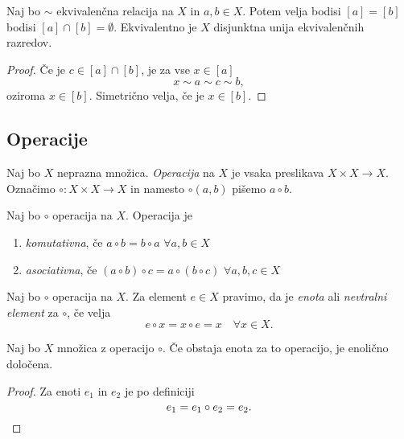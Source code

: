 \documentclass[12pt, a4paper]{article}
\begin{document}
\begin{trditev}
Naj bo $\sim$ ekvivalenčna relacija na $X$ in $a,b\in X$. Potem velja bodisi $[a]=[b]$ bodisi $[a]\cap[b]=\emptyset$. Ekvivalentno je $X$ disjunktna unija ekvivalenčnih razredov.
\end{trditev}

\begin{proof}
Če je $c\in [a]\cap[b]$, je za vse $x\in[a]$
\[
x\sim a\sim c\sim b,
\]
oziroma $x\in[b]$. Simetrično velja, če je $x\in[b]$.
\end{proof}

\newpage

\subsection{Operacije}

\begin{okvir}
\begin{definicija}
Naj bo $X$ neprazna množica. \emph{Operacija} na $X$ je vsaka preslikava $X\times X\to X$. Označimo $\circ\colon X\times X\to X$ in namesto $\circ(a,b)$ pišemo $a\circ b$.
\end{definicija}
\end{okvir}

\begin{definicija}
Naj bo $\circ$ operacija na $X$. Operacija je

\begin{enumerate}[label=\alph*)]
\item \emph{komutativna}, če $a\circ b=b\circ a$ $\forall a,b\in X$
\item \emph{asociativna}, če $(a\circ b)\circ c=a\circ(b\circ c)$ $\forall a,b,c\in X$
\end{enumerate}
\end{definicija}

\begin{definicija}
Naj bo $\circ$ operacija na $X$. Za element $e\in X$ pravimo, da je \emph{enota} ali \emph{nevtralni element} za $\circ$, če velja \[
e\circ x=x\circ e=x\quad\forall x\in X.
\]
\end{definicija}

\begin{trditev}
Naj bo $X$ množica z operacijo $\circ$. Če obstaja enota za to operacijo, je enolično določena.
\end{trditev}

\begin{proof}
Za enoti $e_1$ in $e_2$ je po definiciji
\[
e_1=e_1\circ e_2=e_2.\qedhere
\]
\end{proof}
\end{document}
